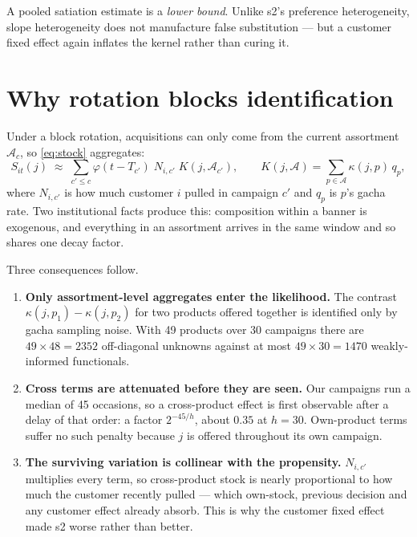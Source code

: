 \documentclass[11pt]{article}
\begin{document}
\noindent A pooled satiation estimate is a \emph{lower bound}. Unlike s2's
preference heterogeneity, slope heterogeneity does not manufacture false
substitution --- but a customer fixed effect again inflates the kernel rather
than curing it.

\section{Why rotation blocks identification}\label{sec:theory}

Under a block rotation, acquisitions can only come from the current assortment
$\mathcal{A}_c$, so \eqref{eq:stock} aggregates:
\begin{equation}
S_{it}(j) \;\approx\; \sum_{c' \le c} \varphi(t - T_{c'})\; N_{i,c'}\;
   K(j, \mathcal{A}_{c'}),
\qquad
K(j,\mathcal{A}) = \sum_{p \in \mathcal{A}} \kappa(j,p)\, q_p ,
\label{eq:collapse}
\end{equation}
where $N_{i,c'}$ is how much customer $i$ pulled in campaign $c'$ and $q_p$ is
$p$'s gacha rate. Two institutional facts produce this: composition within a
banner is exogenous, and everything in an assortment arrives in the same window
and so shares one decay factor.

Three consequences follow.

\begin{enumerate}
\item \textbf{Only assortment-level aggregates enter the likelihood.} The
contrast $\kappa(j,p_1) - \kappa(j,p_2)$ for two products offered together is
identified only by gacha sampling noise. With 49 products over 30 campaigns
there are $49 \times 48 = 2352$ off-diagonal unknowns against at most
$49 \times 30 = 1470$ weakly-informed functionals.

\item \textbf{Cross terms are attenuated before they are seen.} Our campaigns
run a median of 45 occasions, so a cross-product effect is first observable
after a delay of that order: a factor $2^{-45/h}$, about $0.35$ at $h=30$.
Own-product terms suffer no such penalty because $j$ is offered throughout its
own campaign.

\item \textbf{The surviving variation is collinear with the propensity.}
$N_{i,c'}$ multiplies every term, so cross-product stock is nearly proportional
to how much the customer recently pulled --- which own-stock, previous decision
and any customer effect already absorb. This is why the customer fixed effect
made s2 worse rather than better.
\end{enumerate}
\end{document}
